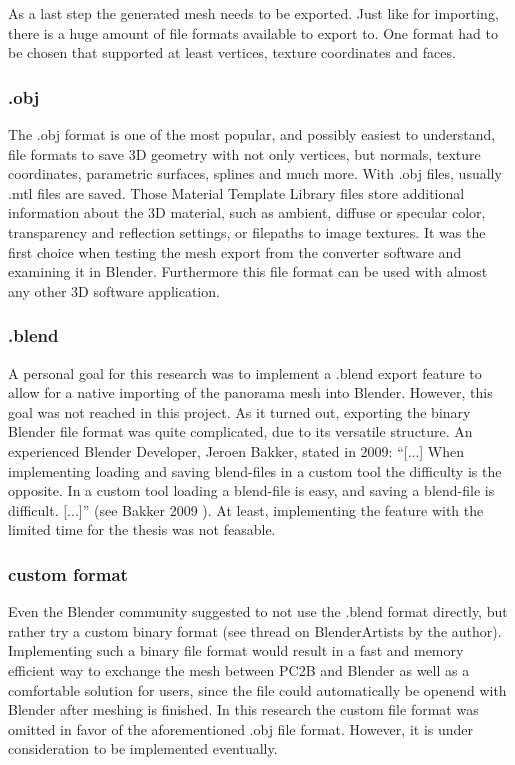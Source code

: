 As a last step the generated mesh needs to be exported. Just like for importing, there is a huge amount of file formats available to export to. One format had to be chosen that supported at least vertices, texture coordinates and faces.

\subsubsection{.obj}

The .obj format is one of the most popular, and possibly easiest to understand, file formats to save 3D geometry with not only vertices, but normals, texture coordinates, parametric surfaces, splines and much more. With .obj files, usually .mtl files are saved. Those Material Template Library files store additional information about the 3D material, such as ambient, diffuse or specular color, transparency and reflection settings, or filepaths to image textures. It was the first choice when testing the mesh export from the converter software and examining it in Blender. Furthermore this file format can be used with almost any other 3D software application.

\subsubsection{.blend}

A personal goal for this research was to implement a .blend export feature to allow for a native importing of the panorama mesh into Blender. However, this goal was not reached in this project. As it turned out, exporting the binary Blender file format was quite complicated, due to its versatile structure. An experienced Blender Developer, Jeroen Bakker, stated in 2009: “[...] When implementing loading and saving blend-files in a custom tool the difficulty is the opposite. In a custom tool loading a blend-file is easy, and saving a blend-file is difficult. [...]” (see Bakker 2009 \parencite{webMysteryOfTheBlend}). At least, implementing the feature with the limited time for the thesis was not feasable.

\subsubsection{custom format}

Even the Blender community suggested to not use the .blend format directly, but rather try a custom binary format (see thread on BlenderArtists \parencite{webBlenderArtistsBlendExport} by the author). Implementing such a binary file format would result in a fast and memory efficient way to exchange the mesh between PC2B and Blender as well as a comfortable solution for users, since the file could automatically be openend with Blender after meshing is finished. In this research the custom file format was omitted in favor of the aforementioned .obj file format. However, it is under consideration to be implemented eventually.





